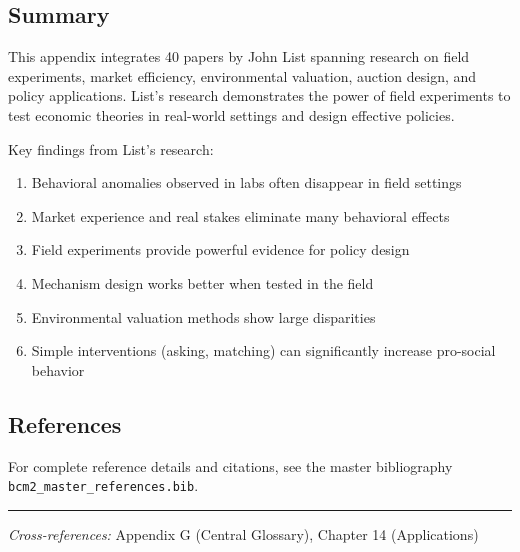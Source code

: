 \subsection{Summary}

This appendix integrates 40 papers by John List spanning research on
field experiments, market efficiency, environmental valuation, auction design, and policy applications.
List's research demonstrates the power of field experiments to test economic theories in real-world settings
and design effective policies.

Key findings from List's research:
\begin{enumerate}
  \item Behavioral anomalies observed in labs often disappear in field settings
  \item Market experience and real stakes eliminate many behavioral effects
  \item Field experiments provide powerful evidence for policy design
  \item Mechanism design works better when tested in the field
  \item Environmental valuation methods show large disparities
  \item Simple interventions (asking, matching) can significantly increase pro-social behavior
\end{enumerate}

\subsection{References}

For complete reference details and citations, see the master bibliography
\texttt{bcm2\_master\_references.bib}.

\vspace{1em}
\hrule
\vspace{0.5em}

\noindent\textit{Cross-references:}
Appendix G (Central Glossary), Chapter 14 (Applications)
